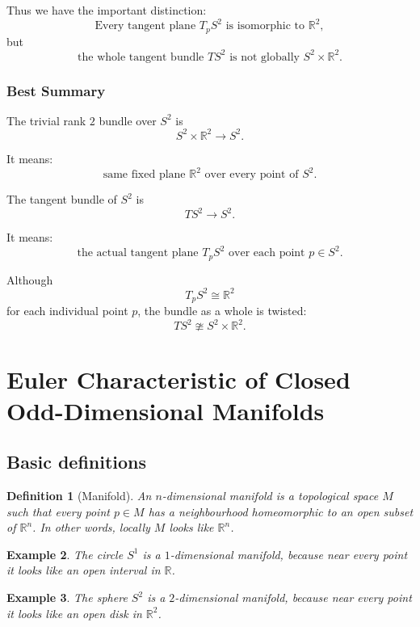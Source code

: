 \documentclass[12pt,a4paper]{article}
\theoremstyle{notespace}
\newtheorem{definition}{Definition}[section]
\newtheorem{example}[definition]{Example}
\begin{document}
Thus we have the important distinction:
\[
\boxed{
	\text{Every tangent plane }T_pS^2
	\text{ is isomorphic to }\mathbb R^2,
}
\]
but
\[
\boxed{
	\text{the whole tangent bundle }TS^2
	\text{ is not globally }S^2\times \mathbb R^2.
}
\]

\subsubsection{Best Summary}

The trivial rank \(2\) bundle over \(S^2\) is
\[
\boxed{
	S^2\times \mathbb R^2\to S^2.
}
\]

It means:
\[
\boxed{
	\text{same fixed plane }\mathbb R^2\text{ over every point of }S^2.
}
\]

The tangent bundle of \(S^2\) is
\[
\boxed{
	TS^2\to S^2.
}
\]

It means:
\[
\boxed{
	\text{the actual tangent plane }T_pS^2\text{ over each point }p\in S^2.
}
\]

Although
\[
T_pS^2\cong \mathbb R^2
\]
for each individual point \(p\), the bundle as a whole is twisted:
\[
\boxed{
	TS^2\ncong S^2\times \mathbb R^2.
}
\]

\section{Euler Characteristic of Closed Odd-Dimensional Manifolds}

\subsection{Basic definitions}

\begin{definition}[Manifold]
	An \emph{$n$-dimensional manifold} is a topological space $M$ such that every point
	$p \in M$ has a neighbourhood homeomorphic to an open subset of $\mathbb{R}^n$.
	In other words, locally $M$ looks like $\mathbb{R}^n$.
\end{definition}

\begin{example}
	The circle $S^1$ is a $1$-dimensional manifold, because near every point it looks
	like an open interval in $\mathbb{R}$.
\end{example}

\begin{example}
	The sphere $S^2$ is a $2$-dimensional manifold, because near every point it looks
	like an open disk in $\mathbb{R}^2$.
\end{example}
\end{document}
